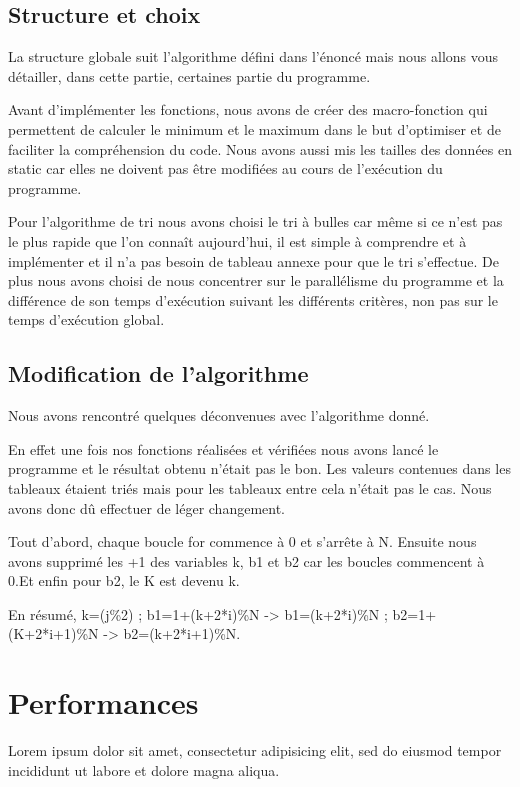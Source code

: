 \documentclass[12pt]{article}
\begin{document}
\subsection{Structure et choix}

    La structure globale suit l'algorithme défini dans l'énoncé mais nous allons vous détailler, dans cette partie, certaines partie du programme.
    
    Avant d'implémenter les fonctions, nous avons de créer des macro-fonction qui permettent de calculer le minimum et le maximum dans le but d'optimiser et de faciliter la compréhension du code. Nous avons aussi mis les tailles des données en static car elles ne doivent pas être modifiées au cours de l'exécution du programme.
    
    Pour l'algorithme de tri nous avons choisi le tri à bulles car même si ce n'est pas le plus rapide que l'on connaît aujourd'hui, il est simple à comprendre et à implémenter et il n'a pas besoin de tableau annexe pour que le tri s'effectue. De plus nous avons choisi de nous concentrer sur le parallélisme du programme et la différence de son temps d'exécution suivant les différents critères, non pas sur le temps d'exécution global.


\subsection{Modification de l'algorithme}

    Nous avons rencontré quelques déconvenues avec l'algorithme donné. 
    
    En effet une fois nos fonctions réalisées et vérifiées nous avons lancé le programme et le résultat obtenu n'était pas le bon. Les valeurs contenues dans les tableaux étaient triés mais pour les tableaux entre cela n'était pas le cas. Nous avons donc dû effectuer de léger changement.
    
    Tout d'abord, chaque boucle for commence à 0 et s'arrête à N.
    Ensuite nous avons supprimé les +1 des variables k, b1 et b2 car les boucles commencent à 0.Et enfin pour b2, le K est devenu k. 

    En résumé, k=(j\%2) ; b1=1+(k+2*i)\%N -> b1=(k+2*i)\%N ; b2=1+(K+2*i+1)\%N -> b2=(k+2*i+1)\%N.

\section{Performances}

Lorem ipsum dolor sit amet, consectetur adipisicing elit, sed do eiusmod tempor
incididunt ut labore et dolore magna aliqua.
\end{document}
